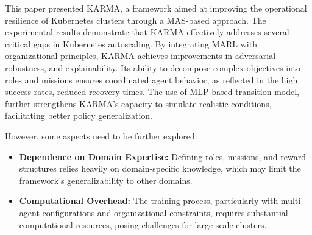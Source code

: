 \documentclass[conference]{IEEEtran}
\begin{document}
This paper presented KARMA, a framework aimed at improving the operational resilience of Kubernetes clusters through a MAS-based approach.
The experimental results demonstrate that KARMA effectively addresses several critical gaps in Kubernetes autoscaling. By integrating MARL with organizational principles, KARMA achieves improvements in adversarial robustness, and explainability. Its ability to decompose complex objectives into roles and missions ensures coordinated agent behavior, as reflected in the high success rates, reduced recovery times. The use of MLP-based transition model, further strengthens KARMA's capacity to simulate realistic conditions, facilitating better policy generalization.
%
%

However, some aspects need to be further explored:
\begin{itemize}
    \item \textbf{Dependence on Domain Expertise:} Defining roles, missions, and reward structures relies heavily on domain-specific knowledge, which may limit the framework's generalizability to other domains.
    \item \textbf{Computational Overhead:} The training process, particularly with multi-agent configurations and organizational constraints, requires substantial computational resources, posing challenges for large-scale clusters.
\end{itemize}
\end{document}
